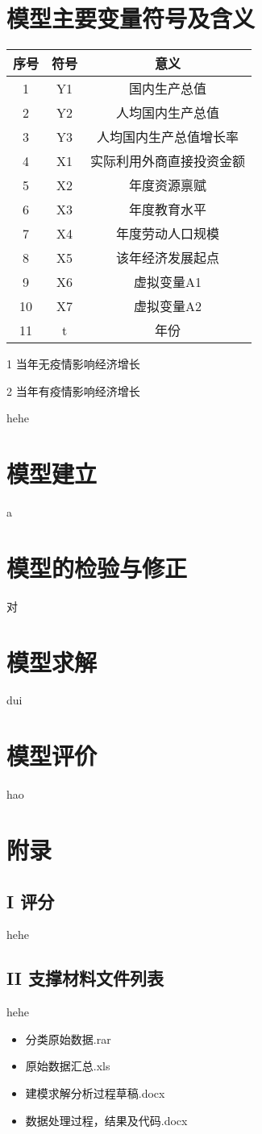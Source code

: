 \documentclass{article}
\begin{document}
	\section{模型主要变量符号及含义}
	\begin{center}
		\begin{threeparttable}
		\setlength{\tabcolsep}{10mm}
		\begin{tabular}{ccc}
		\hline
		序号 & 符号 & 意义\\
		\hline
		1 & Y1 & 国内生产总值\\
		2 & Y2 & 人均国内生产总值\\
		3 & Y3 & 人均国内生产总值增长率\\
		4 & X1 & 实际利用外商直接投资金额\\
		5 & X2 & 年度资源禀赋\\
		6 & X3 & 年度教育水平\\
		7 & X4 & 年度劳动人口规模\\
		8 & X5 & 该年经济发展起点\\
		9 & X6 & 虚拟变量A1\tnote{1}\\
		10 & X7 & 虚拟变量A2\tnote{2}\\
		11 & t & 年份\\
		\hline
		\end{tabular}
	\begin{tablenotes}
		\item [1] 当年无疫情影响经济增长
		\item [2] 当年有疫情影响经济增长
	\end{tablenotes}
\end{threeparttable}
	\end{center}
	hehe
	\section{模型建立}
	a
	\section{模型的检验与修正}
	对
	\section{模型求解}
	dui
	\section{模型评价}
	hao
	
	
	\section*{附录}
	\subsection*{I 评分}
	hehe
	\subsection*{II 支撑材料文件列表}
	hehe
	\begin{itemize}
		\item 分类原始数据.rar
		\item 原始数据汇总.xls
		\item 建模求解分析过程草稿.docx
		\item 数据处理过程，结果及代码.docx
	\end{itemize}
\end{document}
